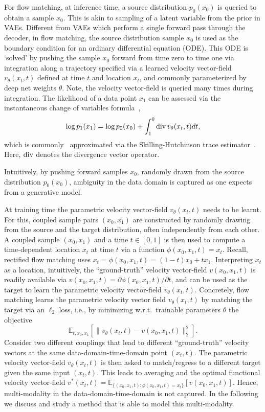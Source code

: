 For flow matching, at inference time, a source distribution $p_0(x_0)$ is queried to obtain a sample $x_0$. This is akin to sampling of a latent variable from the prior in VAEs. Different from VAEs which perform a single forward pass through the decoder, in flow matching, the source distribution sample $x_0$ is used as the boundary condition for an ordinary differential equation (ODE). This ODE is `solved' by pushing the sample $x_0$ forward from time zero to time one via integration along a trajectory specified via a learned velocity vector-field $v_\theta(x_t,t)$ defined at time $t$ and location $x_t$,  and commonly parameterized by deep net weights $\theta$. Note, the velocity vector-field is queried many times during integration. 
The likelihood of a data point $x_1$ can be assessed via the instantaneous change of variables formula~\citep{ChenARXIV2018,SongICLR2021,LipmanICLR2023}, 
\begin{equation}
\log p_1(x_1) = \log p_0(x_0) + \int_1^0 \operatorname{div} v_\theta(x_t,t) dt,
\label{eq:transportintegral}
\end{equation}
which is commonly~\citep{GrathwohlICLR2018} approximated via the Skilling-Hutchinson trace estimator~\citep{Skilling1989,Hutchinson1990}. Here, $\operatorname{div}$ denotes the divergence vector operator. %

Intuitively, by pushing forward samples $x_0$, randomly drawn from the source distribution $p_0(x_0)$, ambiguity in the data domain is captured as one expects from a generative model. 


At training time the parametric velocity vector-field $v_\theta(x_t,t)$ needs to be learnt. For this, 
coupled sample pairs $(x_0, x_1)$ are  constructed by randomly drawing  from the source and the target distribution, often independently from each other. 
A coupled sample $(x_0,x_1)$ and a time $t\in[0,1]$ is then used to compute a time-dependent location $x_t$ at time $t$ via a function $\phi(x_0, x_1, t) = x_t$. Recall, rectified flow matching uses $x_t = \phi(x_0,x_1,t) = (1-t)x_0 + tx_1$. %
Interpreting $x_t$ as a location, intuitively, the ``ground-truth'' velocity vector-field $v(x_0,x_1,t)$ is readily available via $v(x_0,x_1,t) = \partial\phi(x_0,x_1,t)/\partial t$, and can be used as the target to learn the parametric velocity vector-field $v_\theta(x_t,t)$. 
Concretely, flow matching learns the parametric velocity vector field $v_\theta(x_t,t)$ by matching the target via an $\ell_2$ loss, i.e., by minimizing w.r.t.\ trainable parameters $\theta$ the objective
$$
\mathbb{E}_{t,x_0,x_1}\left[\|v_\theta(x_t,t) - v(x_0,x_1,t)\|_2^2\right].
$$
Consider two different couplings that lead to different ``ground-truth'' velocity vectors at the same data-domain-time-domain point $(x_t,t)$. The parametric velocity vector-field $v_\theta(x_t,t)$ is then asked to match/regress to a different target given the same input $(x_t,t)$. This leads to averaging and the optimal functional velocity vector-field $v^\ast(x_t,t) = \mathbb{E}_{\{(x_0,x_1,t) : \phi(x_0,x_1,t) = x_t\}}\left[v(x_0,x_1,t)\right]$. Hence,  multi-modality in the data-domain-time-domain is not captured. In the following we discuss and study a method that is able to model this multi-modality. 

